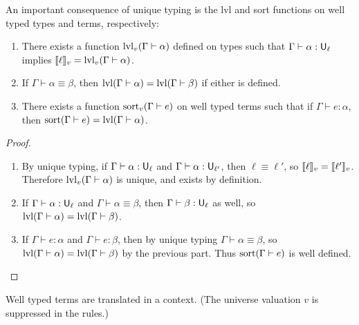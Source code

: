 An important consequence of unique typing is the lvl and sort functions on well typed types and terms, respectively:
\begin{lemma}
\begin{enumerate}
\item There exists a function $\lvl_v(\Gamma\vdash\alpha)$ defined on types such that $\Gamma\vdash\alpha:\U_\ell$ implies $\scott{\ell}_v=\lvl_v(\Gamma\vdash \alpha)$.
\item If $\Gamma\vdash\alpha\equiv\beta$, then $\lvl(\Gamma\vdash\alpha)=\lvl(\Gamma\vdash\beta)$ if either is defined.
\item There exists a function $\sort_v(\Gamma\vdash e)$ on well typed terms such that if $\Gamma\vdash e:\alpha$, then $\sort(\Gamma\vdash e)=\lvl(\Gamma\vdash\alpha)$.
\end{enumerate}
\end{lemma}
\begin{proof}
\begin{enumerate}
\item By unique typing, if $\Gamma\vdash\alpha:\U_\ell$ and $\Gamma\vdash\alpha:\U_{\ell'}$, then $\ell\equiv\ell'$, so $\llbracket \ell\rrbracket_v=\llbracket \ell'\rrbracket_v$. Therefore $\lvl_v(\Gamma\vdash\alpha)$ is unique, and exists by definition.

\item If $\Gamma\vdash\alpha:\U_\ell$ and $\Gamma\vdash\alpha\equiv\beta$, then $\Gamma\vdash\beta:\U_\ell$ as well, so $\lvl(\Gamma\vdash\alpha)=\lvl(\Gamma\vdash\beta)$.

\item If $\Gamma\vdash e:\alpha$ and $\Gamma\vdash e:\beta$, then by unique typing $\Gamma\vdash \alpha\equiv\beta$, so $\lvl(\Gamma\vdash\alpha)=\lvl(\Gamma\vdash\beta)$ by the previous part. Thus $\sort(\Gamma\vdash e)$ is well defined.
\end{enumerate}\vspace{-1.5em}
\end{proof}
Well typed terms are translated in a context. (The universe valuation $v$ is suppressed in the rules.)
